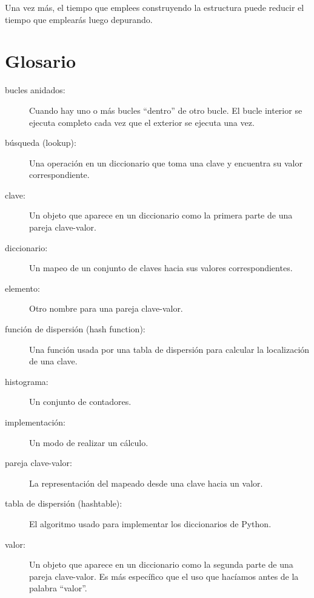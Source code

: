 Una vez más, el tiempo que emplees construyendo la estructura puede reducir
el tiempo que emplearás luego depurando.


\section{Glosario}

\begin{description}

\item[bucles anidados:] Cuando hay uno o más bucles ``dentro'' de
otro bucle. El bucle interior se ejecuta completo cada vez que el exterior
se ejecuta una vez.

\item[búsqueda (lookup):] Una operación en un diccionario que toma una clave
y encuentra su valor correspondiente.

\item[clave:] Un objeto que aparece en un diccionario como la
primera parte de una pareja clave-valor.

\item[diccionario:] Un mapeo de un conjunto de claves hacia sus
valores correspondientes.

\item[elemento:] Otro nombre para una pareja clave-valor.

\item[función de dispersión (hash function):] Una función usada por una tabla de dispersión
para calcular la localización de una clave.

\item[histograma:] Un conjunto de contadores.

\item[implementación:] Un modo de realizar un cálculo.

\item[pareja clave-valor:] La representación del mapeado desde
una clave hacia un valor.

\item[tabla de dispersión (hashtable):] El algoritmo usado para implementar
los diccionarios de Python.

\item[valor:] Un objeto que aparece en un diccionario como la
segunda parte de una pareja clave-valor. Es más específico que
el uso que hacíamos antes de la palabra ``valor''.

\end{description}

